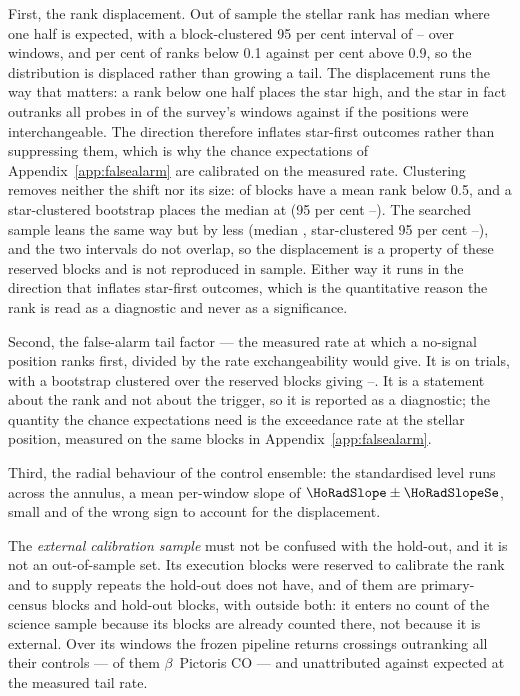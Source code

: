 First, the rank displacement. Out of sample the stellar rank has median
\HoRankMed{} where one half is expected, with a block-clustered 95 per cent
interval of \HoRankMedLo--\HoRankMedHi{} over \HoWin{} windows, and
\HOFracLoPct{} per cent of ranks below 0.1 against \HOFracHiPct{} per cent
above 0.9, so the distribution is displaced rather than growing a tail. The
displacement runs the way that matters: a rank below one half places the star
high, and the star in fact outranks all \NCtrl{} probes in \NsrFirstObs{} of
the survey's windows against \NsrFirstExp{} if the positions were
interchangeable. The direction therefore inflates star-first outcomes rather
than suppressing them, which is why the chance expectations of
Appendix~\ref{app:falsealarm} are calibrated on the measured rate.
Clustering removes neither the shift nor its size: \HOBlockBelow{} of
\HOBlockN{} blocks have a mean rank below 0.5, and a star-clustered bootstrap
places the median at \HOBootMed{} (95 per cent \HOBootLo--\HOBootHi). The
searched sample leans the same way but by less (median \SurvMedP,
star-clustered 95 per cent \SurvBootLo--\SurvBootHi), and the two
intervals do not overlap, so the displacement is a property of these
reserved blocks and is not reproduced in sample. Either way it runs in the
direction that inflates star-first outcomes, which is the quantitative
reason the rank is read as a diagnostic and never as a significance.

Second, the false-alarm tail factor --- the measured rate at which a
no-signal position ranks first, divided by the rate exchangeability would
give. It is \HoTailFactor{} on \HoPseudoTrials{} trials, with a bootstrap
clustered over the \HoTailBlocks{} reserved blocks giving
\HoTailLo--\HoTailHi. It is a statement about the rank and not about the
trigger, so it is reported as a diagnostic; the quantity the chance
expectations need is the exceedance rate at the stellar position, measured
on the same blocks in Appendix~\ref{app:falsealarm}.

Third, the radial behaviour of the control ensemble: the standardised level
runs \HoRadBins{} across the annulus, a mean per-window slope of
$\HoRadSlope\pm\HoRadSlopeSe$, small and of the wrong sign to account for the
displacement.

The \emph{external calibration sample} must not be confused with the
hold-out, and it is not an out-of-sample set. Its \CampBlocks{} execution
blocks were reserved to calibrate the rank and to supply repeats the hold-out
does not have, and \CalNCensus{} of them are primary-census blocks and
\CalNHoldout{} hold-out blocks, with \CalNOutside{} outside both: it enters no
count of the science sample because its blocks are already counted there, not
because it is external. Over its \CampWindows{} windows the frozen pipeline
returns \CampStageOne{} crossings outranking all their controls ---
\CampStageOneCO{} of them $\beta$~Pictoris CO --- and \CampUnattrib{}
unattributed against \CampExpUn{} expected at the measured tail rate.

